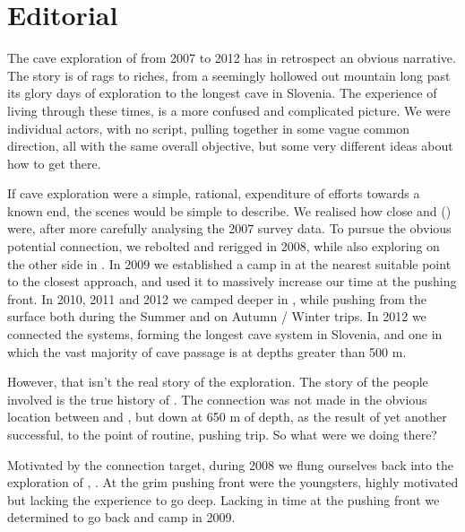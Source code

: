\chapter*{Editorial}


The cave exploration of  from 2007 to 2012 has in
retrospect an obvious narrative. The story is of rags to riches, from a
seemingly hollowed out mountain long past its glory days of exploration
to the longest cave in Slovenia. The experience of living through these
times, is a more confused and complicated picture. We were individual
actors, with no script, pulling together in some vague common
direction, all with the same overall objective, but some very different
ideas about how to get there.

If cave exploration were a simple, rational, expenditure of efforts
towards a known end, the scenes would be simple to describe. We realised
how close  and  () were, after more
carefully analysing the 2007  survey data. To pursue
the obvious potential connection, we rebolted and rerigged 
in 2008, while also exploring on the other side in . In 2009 we established a camp in  at the nearest suitable point to the closest approach, and used it to massively increase our time at the pushing front. In 2010, 2011 and 2012 we camped deeper in ,
while pushing  from the surface both during the Summer and on
Autumn / Winter trips. In 2012 we connected the systems, forming the
longest cave system in Slovenia, and one in which the vast majority of
cave passage is at depths greater than 500 m.

However, that isn't the real story of the exploration. The story of the
people involved is the true history of . The connection was not
made in the obvious location between  and , but down
at 650 m of depth, as the result of yet another successful, to the point
of routine, pushing trip. So what were we doing there?

Motivated by the connection target, during 2008 we flung ourselves back into the exploration of , . At the grim pushing front were the youngsters, highly motivated but lacking the experience to go deep. Lacking in time at the pushing front we determined to go back and camp in 2009. 

